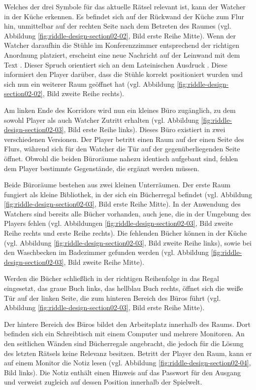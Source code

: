 Welches der drei Symbole für das aktuelle Rätsel relevant ist, kann der Watcher in der Küche erkennen. Es befindet sich auf der Rückwand der Küche zum Flur hin, unmittelbar auf der rechten Seite nach dem Betreten des Raumes (vgl. Abbildung \ref{fig:riddle-design-section02-02}, Bild erste Reihe Mitte). Wenn der Watcher daraufhin die Stühle im Konferenzzimmer entsprechend der richtigen Anordnung platziert, erscheint eine neue Nachricht auf der Leinwand mit dem Text . Dieser Spruch orientiert sich an dem Lateinischen Ausdruck . Diese informiert den Player darüber, dass die Stühle korrekt positioniert wurden und sich nun ein weiterer Raum geöffnet hat (vgl. Abbildung \ref{fig:riddle-design-section02-02}, Bild zweite Reihe rechts).

Am linken Ende des Korridors wird nun ein kleines Büro zugänglich, zu dem sowohl Player als auch Watcher Zutritt erhalten (vgl. Abbildung \ref{fig:riddle-design-section02-03}, Bild erste Reihe links). Dieses Büro existiert in zwei verschiedenen Versionen. Der Player betritt einen Raum auf der einen Seite des Flurs, während sich für den Watcher die Tür auf der gegenüberliegenden Seite öffnet. Obwohl die beiden Büroräume nahezu identisch aufgebaut sind, fehlen dem Player bestimmte Gegenstände, die ergänzt werden müssen.

Beide Büroräume bestehen aus zwei kleinen Unterräumen. Der erste Raum fungiert als kleine Bibliothek, in der sich ein Bücherregal befindet (vgl. Abbildung \ref{fig:riddle-design-section02-03}, Bild erste Reihe Mitte). In der Anwendung des Watchers sind bereits alle Bücher vorhanden, auch jene, die in der Umgebung des Players fehlen (vgl. Abbildungen \ref{fig:riddle-design-section02-03}, Bild zweite Reihe rechts und erste Reihe rechts). Die fehlenden Bücher können in der Küche (vgl. Abbildung \ref{fig:riddle-design-section02-03}, Bild zweite Reihe links), sowie bei den Waschbecken im Badezimmer gefunden werden (vgl. Abbildung \ref{fig:riddle-design-section02-03}, Bild zweite Reihe Mitte).

Werden die Bücher schließlich in der richtigen Reihenfolge in das Regal eingesetzt, das graue Buch links,  das hellblau Buch rechts, öffnet sich die weiße Tür auf der linken Seite, die zum hinteren Bereich des Büros führt (vgl. Abbildung \ref{fig:riddle-design-section02-03}, Bild erste Reihe Mitte).

Der hintere Bereich des Büros bildet den Arbeitsplatz innerhalb des Raums. Dort befinden sich ein Schreibtisch mit einem Computer und mehrere Monitoren. An den seitlichen Wänden sind Bücherregale angebracht, die jedoch für die Lösung des letzten Rätsels keine Relevanz besitzen. Betritt der Player den Raum, kann er auf einem Monitor die Notiz  lesen (vgl. Abbildung \ref{fig:riddle-design-section02-04}, Bild links). Die Notiz enthält einen Hinweis auf das Passwort für den Ausgang und verweist zugleich auf dessen Position innerhalb der Spielwelt.

